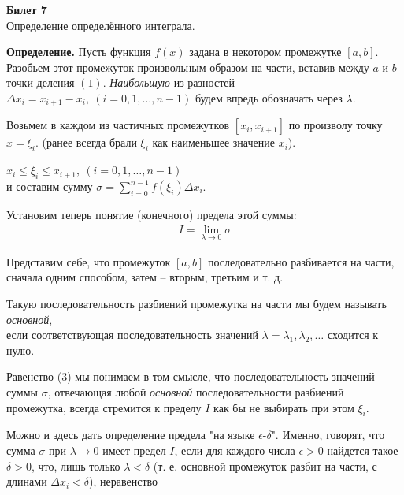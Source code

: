 \documentclass[a4paper]{report}
\begin{document}
\setlength{\parskip}{6pt}

\noindent
\begin{center}
    \textbf{Билет 7}\\
    Определение определённого интеграла.\\
\end{center}

\textbf{Определение.} Пусть функция $ f(x) $ задана в некотором промежутке $ [a, b] $.
Разобьем этот промежуток произвольным образом на части, вставив между $ a $ и $ b $
точки деления $ (1) $. \emph{Наибольшую} из разностей
$ \Delta x_i = x_{i + 1} - x_{i},\ (i = 0, 1, \ldots, n - 1) $ будем впредь
обозначать через $ \lambda $.

Возьмем в каждом из частичных промежутков $ [x_i, x_{i + 1}] $ по произволу точку 
$ x = \xi_i $. (ранее всегда брали $ \xi_i $ как наименьшее значение $ x_i $).

\begin{center}
    $ x_i \leq \xi_i \leq x_{i + 1},\ (i = 0, 1, \ldots, n - 1) $\\
    и составим сумму $ \sigma = \sum\limits_{i = 0}^{n - 1} f(\xi_i) \Delta x_i $.
\end{center}

\begin{center}
    Установим теперь понятие (конечного) предела этой суммы:\\ 
    \begin{equation}\label{eq3}
        \begin{gathered}
            I = \lim\limits_{\lambda \to 0}{\sigma}
        \end{gathered}
    \end{equation}
\end{center}
Представим себе, что промежуток $ [a, b] $ последовательно разбивается на части,
сначала одним способом, затем -- вторым, третьим и т. д.

\noindent Такую последовательность разбиений промежутка на части мы будем называть 
\emph{основной},\\
если соответствующая последовательность значений $ \lambda = \lambda_1, \lambda_2, \ldots $
сходится к нулю.

Равенство (3) мы понимаем в том смысле, что последовательность значений суммы
$ \sigma $, отвечающая любой \emph{основной} последовательности разбиений промежутка,
всегда стремится к пределу $ I $ как бы не выбирать при этом $ \xi_i $.

Можно и здесь дать определение предела "на языке $ \epsilon $-$ \delta $". Именно,
говорят, что сумма $ \sigma $ при $ \lambda \to 0 $ имеет предел $ I $, если для
каждого числа $ \epsilon > 0 $ найдется такое $ \delta > 0 $, что, лишь только
$ \lambda < \delta $ (т. е. основной промежуток разбит на части, с длинами 
$ \Delta x_i < \delta $), неравенство 
\end{document}
